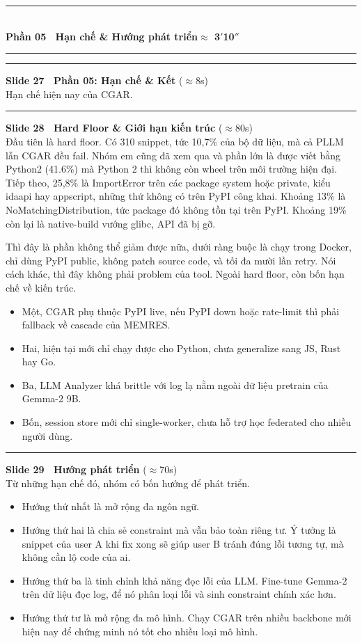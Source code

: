 \documentclass[11pt]{article}
\newcommand{\parthead}[2]{%
  \vspace{1.4em}\par
  {\noindent\color{navydeep}\rule{\linewidth}{1.4pt}}\\[0.35em]
  {\bfseries\Large\color{navydeep}#1}\hfill{\normalsize\color{accent}\bfseries #2}\\[-0.35em]
  {\noindent\color{navydeep}\rule{\linewidth}{1.4pt}}
  \par\vspace{0.6em}%
}
\newcommand{\slidehead}[3]{%
  \vspace{1.05em}\par\noindent
  {\color{accent}\rule[-0.18em]{3pt}{1.05em}}\hspace{0.5em}%
  {\bfseries\large\color{navydeep}Slide #1 \textperiodcentered\ #2}%
  \hfill{\small\color{gray}(#3)}\\[0.25em]%
}
\begin{document}
\parthead{Phần 05 \textperiodcentered\ Hạn chế \& Hướng phát triển}{$\approx$ 3$'$10$''$}

\slidehead{27}{Phần 05: Hạn chế \& Kết}{$\approx$8s}
Hạn chế hiện nay của CGAR.

\slidehead{28}{Hard Floor \& Giới hạn kiến trúc}{$\approx$80s}
Đầu tiên là hard floor. Có 310 snippet, tức 10,7\% của bộ dữ liệu, mà cả PLLM lẫn CGAR đều fail. Nhóm em cũng đã xem qua và phần lớn là được viết bằng Python2 (41.6\%) mà Python 2 thì không còn wheel trên môi trường hiện đại. Tiếp theo, 25,8\% là ImportError trên các package system hoặc private, kiểu idaapi hay appscript, những thứ không có trên PyPI công khai. Khoảng 13\% là NoMatchingDistribution, tức package đó không tồn tại trên PyPI. Khoảng 19\% còn lại là native-build vướng glibc, API đã bị gỡ.

Thì đây là phần không thể giảm được nữa, dưới ràng buộc là chạy trong Docker, chỉ dùng PyPI public, không patch source code, và tối đa mười lần retry. Nói cách khác, thì đây không phải problem của tool. Ngoài hard floor, còn bốn hạn chế về kiến trúc.
\begin{itemize}
  \item Một, CGAR phụ thuộc PyPI live, nếu PyPI down hoặc rate-limit thì phải fallback về cascade của MEMRES.
  \item Hai, hiện tại mới chỉ chạy được cho Python, chưa generalize sang JS, Rust hay Go.
  \item Ba, LLM Analyzer khá brittle với log lạ nằm ngoài dữ liệu pretrain của Gemma-2 9B.
  \item Bốn, session store mới chỉ single-worker, chưa hỗ trợ học federated cho nhiều người dùng.
\end{itemize}

\slidehead{29}{Hướng phát triển}{$\approx$70s}
Từ những hạn chế đó, nhóm có bốn hướng để phát triển.
\begin{itemize}
  \item Hướng thứ nhất là mở rộng đa ngôn ngữ.
  \item Hướng thứ hai là chia sẻ constraint mà vẫn bảo toàn riêng tư. Ý tưởng là snippet của user A khi fix xong sẽ giúp user B tránh đúng lỗi tương tự, mà không cần lộ code của ai.
  \item Hướng thứ ba là tinh chỉnh khả năng đọc lỗi của LLM. Fine-tune Gemma-2 trên dữ liệu đọc log, để nó phân loại lỗi và sinh constraint chính xác hơn.
  \item Hướng thứ tư là mở rộng đa mô hình. Chạy CGAR trên nhiều backbone mới hiện nay để chứng minh nó tốt cho nhiều loại mô hình.
\end{itemize}
\end{document}
